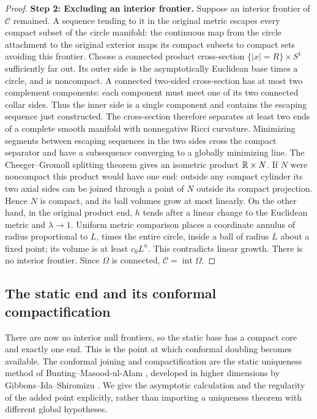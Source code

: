 \begin{proof}
\smallskip\noindent
\textbf{Step 2: Excluding an interior frontier.}
Suppose an interior frontier of $\mathcal C$ remained.  A
sequence tending to it in the original metric escapes every
compact subset of the circle manifold: the continuous map
from the circle attachment to the original exterior maps its
compact subsets to compact sets avoiding this frontier.
Choose a connected product cross-section
$\{|x|=R\}\times S^1$ sufficiently far out.  Its outer side
is the asymptotically Euclidean base times a circle, and is
noncompact.  A connected two-sided cross-section has at most two
complement components: each component must meet one of its two
connected collar sides.  Thus the inner side is a single component
and contains the escaping sequence just constructed.  The
cross-section therefore separates at least two ends of a
complete smooth manifold with nonnegative Ricci curvature.
Minimizing segments between escaping sequences in the two
sides cross the compact separator and have a subsequence
converging to a globally minimizing line.  The
Cheeger--Gromoll splitting theorem
\cite{CheegerGromoll1971} gives an isometric product
$\mathbb R\times N$.  If $N$ were noncompact this product would
have one end: outside any compact cylinder its two axial
sides can be joined through a point of $N$ outside its compact
projection.  Hence $N$ is compact, and its ball volumes grow
at most linearly.  On the other hand, in the original product
end, $h$ tends after a linear change to the Euclidean metric
and $\lambda\to1$.  Uniform metric comparison places a
coordinate annulus of radius proportional to $L$, times the
entire circle, inside a ball of radius $L$ about a fixed
point; its volume is at least $c_0L^n$.  This contradicts
linear growth.  There is no interior frontier.  Since
$\Omega$ is connected, $\mathcal C=\operatorname{int}\Omega$.
\end{proof}

\subsection{The static end and its conformal compactification}
\label{subsec:static:compactification}

There are now no interior null frontiers, so the static base has a
compact core and exactly one end.  This is the point at which conformal
doubling becomes available.  The conformal joining and compactification
are the static uniqueness method of Bunting--Masood-ul-Alam
\cite{BuntingMasoodUlAlam1987}, developed in higher dimensions by
Gibbons--Ida--Shiromizu
\cite[Section~2, Equations~(2.6)--(2.12)]{GibbonsIdaShiromizu2002}.
We give the asymptotic calculation and the regularity of the added
point explicitly, rather than importing a uniqueness theorem with
different global hypotheses.

